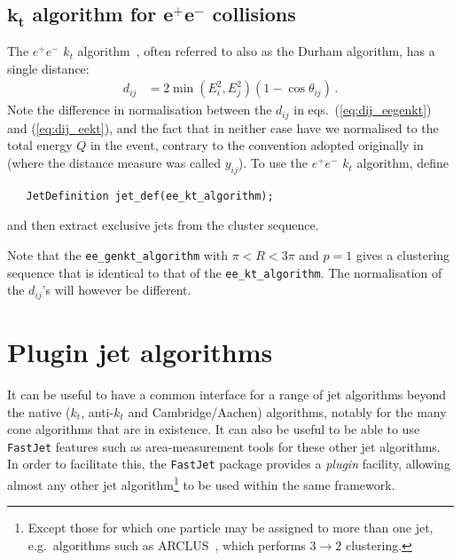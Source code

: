 \documentclass[12pt,a4]{article}
\newcommand{\fastjet}{\texttt{FastJet}\xspace}
\newcommand{\ttt}[1]{{\small\texttt{#1}}}
\begin{document}
\subsection[$k_t$ algorithm for $e^+e^-$ collisions]
{$\boldsymbol{k_t}$ algorithm for $\boldsymbol{e^+e^-}$ collisions}
\label{sec:kt-ee-alg}

The $e^+e^-$ $k_t$ algorithm~\cite{eekt}, often referred to also as
the Durham algorithm,  has a single distance:
\begin{align}
  \label{eq:dij_eekt}
  d_{ij} &= 2 \min(E_i^{2}, E_j^{2}) (1- \cos \theta_{ij})\,.
\end{align}
Note the difference in normalisation between the $d_{ij}$ in
eqs.~(\ref{eq:dij_eegenkt}) and (\ref{eq:dij_eekt}), and the fact that in neither
case have we normalised to the total energy $Q$ in the event, contrary
to the convention adopted originally in~\cite{eekt} (where the
distance measure was called $y_{ij}$).
%
To use the $e^+e^-$ $k_t$  algorithm, define 
\begin{lstlisting}
   JetDefinition jet_def(ee_kt_algorithm);
\end{lstlisting}
and then extract exclusive jets from the cluster sequence.

%
Note that the \ttt{ee\_genkt\_algorithm} with $ \pi < R < 3\pi$ and
$p=1$ gives a clustering sequence that is identical to that of the
\ttt{ee\_kt\_algorithm}.
%
The normalisation of the $d_{ij}$'s will however be different.


\section{Plugin jet algorithms}
\label{sec:plugins}

It can be useful to have a common interface for a range of jet
algorithms beyond the native ($k_t$, anti-$k_t$ and Cambridge/Aachen)
algorithms, notably for the many cone algorithms that are in
existence. 
%
It can also be useful to be able to use \fastjet features such as
area-measurement tools for these other jet algorithms.
%
In order to facilitate this, the
\fastjet package provides a \emph{plugin} facility, allowing almost
any other jet algorithm\footnote{Except those for which one particle
  may be assigned to more than one jet, e.g.\ algorithms such as
  ARCLUS~\cite{Lonnblad:1992qd}, which performs $3\to2$
  clustering.} to be used within the same framework.
\end{document}
